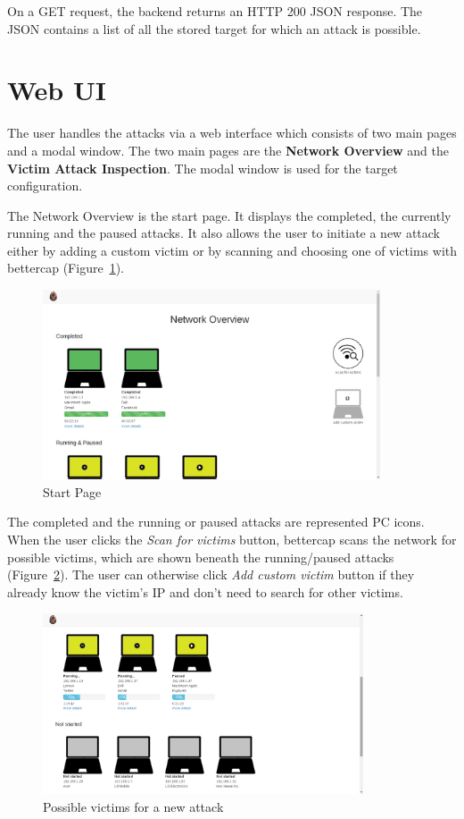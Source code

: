 \documentclass[a4paper, 11 pt, conference]{article}
\begin{document}
On a GET request, the backend returns an HTTP 200 JSON response. The JSON contains a list of all the stored target for which an attack is possible.


\section{Web UI}

The user handles the attacks via a web interface which consists of two main pages and a modal window. The two main pages are the \textbf{Network Overview} and the \textbf{Victim Attack Inspection}. The modal window is used for the target configuration.

The Network Overview is the start page. It displays the completed, the currently running and the paused attacks. It also allows the user to initiate a new attack either by adding a custom victim or by scanning and choosing one of victims with bettercap (Figure~\ref{fig:start}).

\begin{figure}[thpb]
	\centering
	\includegraphics[width=100mm]{figures/startPage.png}
	\caption{Start Page}
	\label{fig:start}
\end{figure}

The completed and the running or paused attacks are represented PC icons. When the user clicks the \textit{Scan for victims} button, bettercap scans the network for possible victims, which are shown beneath the running/paused attacks (Figure~\ref{fig:attack}). The user can otherwise click \textit{Add custom victim} button if they already know the victim’s IP and don’t need to search for other victims.

\begin{figure}[thpb]
	\centering
	\includegraphics[width=95mm]{figures/notstarted.png}
	\caption{Possible victims for a new attack}
	 \label{fig:attack}

\end{figure}
\end{document}
